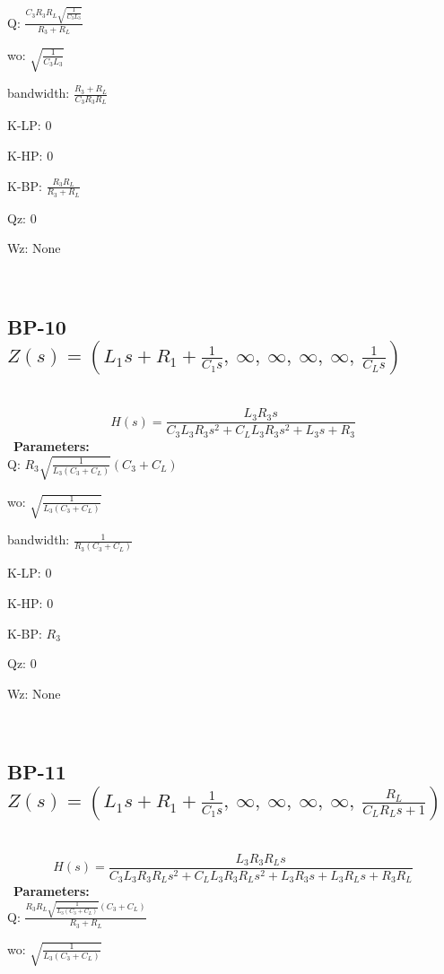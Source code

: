 \documentclass{article}
\begin{document}
Q: $\frac{C_{3} R_{3} R_{L} \sqrt{\frac{1}{C_{3} L_{3}}}}{R_{3} + R_{L}}$\ 

wo: $\sqrt{\frac{1}{C_{3} L_{3}}}$\ 

bandwidth: $\frac{R_{3} + R_{L}}{C_{3} R_{3} R_{L}}$\ 

K-LP: $0$\ 

K-HP: $0$\ 

K-BP: $\frac{R_{3} R_{L}}{R_{3} + R_{L}}$\ 

Qz: $0$\ 

Wz: $\text{None}$\ 

\ 

\subsection{BP-10 $Z(s) = \left( L_{1} s + R_{1} + \frac{1}{C_{1} s}, \  \infty, \  \infty, \  \infty, \  \infty, \  \frac{1}{C_{L} s}\right)$ } \ 
\textbf{\[H(s) = \frac{L_{3} R_{3} s}{C_{3} L_{3} R_{3} s^{2} + C_{L} L_{3} R_{3} s^{2} + L_{3} s + R_{3}}\] } \ 
\textbf{Parameters:}\\ 

Q: $R_{3} \sqrt{\frac{1}{L_{3} \left(C_{3} + C_{L}\right)}} \left(C_{3} + C_{L}\right)$\ 

wo: $\sqrt{\frac{1}{L_{3} \left(C_{3} + C_{L}\right)}}$\ 

bandwidth: $\frac{1}{R_{3} \left(C_{3} + C_{L}\right)}$\ 

K-LP: $0$\ 

K-HP: $0$\ 

K-BP: $R_{3}$\ 

Qz: $0$\ 

Wz: $\text{None}$\ 

\ 

\subsection{BP-11 $Z(s) = \left( L_{1} s + R_{1} + \frac{1}{C_{1} s}, \  \infty, \  \infty, \  \infty, \  \infty, \  \frac{R_{L}}{C_{L} R_{L} s + 1}\right)$ } \ 
\textbf{\[H(s) = \frac{L_{3} R_{3} R_{L} s}{C_{3} L_{3} R_{3} R_{L} s^{2} + C_{L} L_{3} R_{3} R_{L} s^{2} + L_{3} R_{3} s + L_{3} R_{L} s + R_{3} R_{L}}\] } \ 
\textbf{Parameters:}\\ 

Q: $\frac{R_{3} R_{L} \sqrt{\frac{1}{L_{3} \left(C_{3} + C_{L}\right)}} \left(C_{3} + C_{L}\right)}{R_{3} + R_{L}}$\ 

wo: $\sqrt{\frac{1}{L_{3} \left(C_{3} + C_{L}\right)}}$\ 
\end{document}
